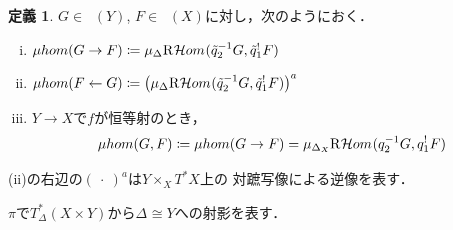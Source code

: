 \documentclass[leqno, 10pt, a4paper, dvipdfmx]{jsarticle}
\theoremstyle{definition}
\numberwithin{equation}{section}
\newcommand{\Dompb}{\mathop{\mathsf{D}^\mathrm{b}}\nolimits}
\newcommand{\HOM}{\mathop{\mathcal{H}\hspace{-0pt}om}\nolimits}%
\newcommand{\RHOM}{\mathop{\mathrm{R}\hspace{-1.5pt}\HOM}\nolimits}
\newcommand{\blk}{\mathord{\ \cdot\ }}
\newcommand{\tpb}[1][]{\mathbin{\mathop{\times}\nolimits_{#1}}}
\theoremstyle{mystyle}
\newtheorem{DFN}[AXM]{定義}
\newcommand{\cotb}[1][]{T^{\ast}{#1}}
\newcommand{\muhom}{\mu hom}
\newcommand{\diag}[1][]{\Delta_{#1}}
\newcommand{\micro}[1]{\mu_{#1}\hspace{-2pt}}
\begin{document}
\begin{DFN}\label{dfn4.4.1}
  \(G\in\Dompb(Y)\), \(F\in\Dompb(X)\)に対し，次のようにおく．
  \begin{enumerate}[(i)]
    \item \(
      \muhom(G\to F)
      \coloneqq
      \micro{\diag[]}\RHOM_{
        }(\tilde{q}_2^{-1}G,\tilde{q}_1^{!}F)\)
    \item \(
      \muhom(F\leftarrow G)
      \coloneqq
      \left(
        \micro{\diag[]}\RHOM_{
        }(\tilde{q}_2^{-1}G,\tilde{q}_1^{!}F)
      \right)^{a}\)
    \item \(Y\to X\)で\(f\)が恒等射のとき，\[
      \muhom(G,F)
      \coloneqq\muhom(G\to F)
      =\micro{\diag[X]}\RHOM_{
      }({q}_2^{-1}G,{q}_1^{!}F)
    \]
  \end{enumerate}
\end{DFN}
(ii)の右辺の\((\blk)^{a}\)は\(Y\tpb[X]\cotb[X]\)上の
対蹠写像による逆像を表す．

\(\pi\)で\(T^{\ast}_{\diag[]}(X\times Y)\)から\(\diag[]\cong Y\)への射影を表す．
\end{document}
